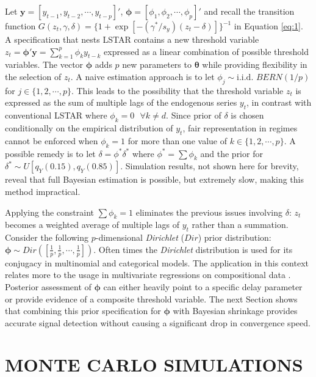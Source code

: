 Let $\bm{y}=[y_{t-1}, y_{t-2},\cdots,y_{t-p}]'$, $\bm{\phi}=[\phi_{1}, \phi_{2},\cdots,\phi_{p}]'$ and recall the transition function $G(z_t,\gamma,\delta)=\{1+\exp[-(\gamma^*/s_y)(z_t-\delta)]\}^{-1}$ in Equation \ref{eq:1}. A specification that nests LSTAR contains a new threshold variable $z_t=\bm{\phi}'\bm{y}=\sum\limits_{k=1}^p \phi_ky_{t-k}$ expressed as a linear combination of possible threshold variables. The vector $\bm{\phi}$ adds $p$ new parameters to $\bm{\theta}$  while providing flexibility in the selection of $z_t$. A naive estimation approach is to let $\phi_j \sim \textrm{i.i.d. } BERN(1/p)$ for $j \in \{1,2,\cdots,p\}$. This leads to the possibility that the threshold variable $z_t$ is expressed as the sum of multiple lags of the endogenous series $y_t$, in contrast with conventional LSTAR where $\phi_k=0 \textrm{ } \forall k\neq d$. Since prior of $\delta$ is chosen conditionally on the empirical distribution of $y_t$, fair representation in regimes cannot be enforced when $\phi_k=1$ for more than one value of $k \in \{1,2, \cdots, p\}$. A possible remedy is to let $\delta=\phi^*\delta^*$ where $\phi^*=\sum \phi_k$ and the prior for $\delta^* \sim U[q_Y(0.15),q_Y(0.85)]$. Simulation results, not shown here for brevity, reveal that full Bayesian estimation is possible, but extremely slow, making this method impractical. 

Applying the constraint $\sum \phi_k =1$ eliminates the previous issues involving $\delta$: $z_t$ becomes a weighted average of multiple lags of $y_t$ rather than a summation. Consider the following $p$-dimensional \textit{Dirichlet} ($Dir$) prior distribution: $\bm{\phi} \sim Dir([\frac{1}{p},\frac{1}{p},\cdots, \frac{1}{p}])$. Often times the \textit{Dirichlet} distribution is used for its conjugacy in multinomial and categorical models. The application in this context relates more to the usage in multivariate regressions on compositional data \citep{Campbell1987,Hijazi2009}. Posterior assessment of $\bm{\phi}$ can either heavily point to a specific delay parameter or provide evidence of a composite threshold variable. The next Section shows that combining this prior specification for $\bm{\phi}$ with Bayesian shrinkage provides accurate signal detection without causing a significant drop in convergence speed. 

\section{MONTE CARLO SIMULATIONS}

